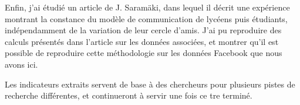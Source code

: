 \documentclass[]{article}
\def\fb{Facebook}
\begin{document}
Enfin, j’ai étudié un article de J. Saram\"aki, dans lequel il décrit une
expérience montrant la constance du modèle de communication de lycéens puis
étudiants, indépendamment de la variation de leur cercle d’amis. J’ai pu
reproduire des calculs présentés dans l’article sur les données associées, et
montrer qu’il est possible de reproduire cette méthodologie sur les données
\fb{} que nous avons ici.

Les indicateurs extraits servent de base à des chercheurs pour plusieurs pistes
de recherche différentes, et continueront à servir une fois ce {\sc tre}
terminé.
\end{document}
